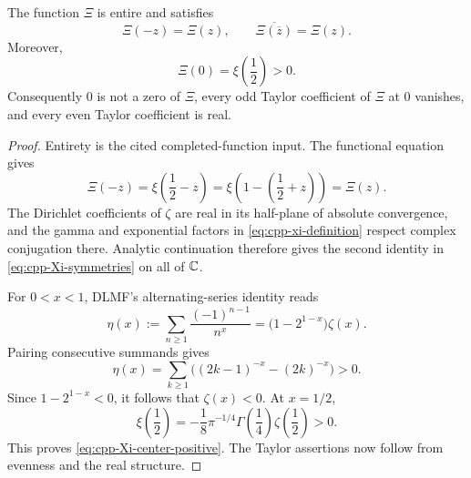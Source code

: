 \begin{proposition}
\label{prop:cpp-centered-symmetry}
The function \(\Xi\) is entire and satisfies
\begin{equation}
\label{eq:cpp-Xi-symmetries}
 \Xi(-z)=\Xi(z),
 \qquad
 \overline{\Xi(\overline z)}=\Xi(z).
\end{equation}
Moreover,
\begin{equation}
\label{eq:cpp-Xi-center-positive}
 \Xi(0)=\xi\!\left(\frac12\right)>0.
\end{equation}
Consequently \(0\) is not a zero of \(\Xi\), every odd Taylor coefficient of
\(\Xi\) at \(0\) vanishes, and every even Taylor coefficient is real.
\end{proposition}

\begin{proof}
Entirety is the cited completed-function input.  The functional equation gives
\[
 \Xi(-z)
 =
 \xi\!\left(\frac12-z\right)
 =
 \xi\!\left(1-\left(\frac12+z\right)\right)
 =
 \Xi(z).
\]
The Dirichlet coefficients of \(\zeta\) are real in its half-plane of absolute
convergence, and the gamma and exponential factors in
\eqref{eq:cpp-xi-definition} respect complex conjugation there.  Analytic
continuation therefore gives the second identity in
\eqref{eq:cpp-Xi-symmetries} on all of \(\mathbb C\).

For \(0<x<1\), DLMF's alternating-series identity
\cite[\S25.2, Eq.~25.2.3]{apostolDLMF25} reads
\[
 \eta(x)
 :=
 \sum_{n\geq1}\frac{(-1)^{n-1}}{n^x}
 =
 \bigl(1-2^{1-x}\bigr)\zeta(x).
\]
Pairing consecutive summands gives
\[
 \eta(x)
 =
 \sum_{k\geq1}\bigl((2k-1)^{-x}-(2k)^{-x}\bigr)>0.
\]
Since \(1-2^{1-x}<0\), it follows that \(\zeta(x)<0\).  At \(x=1/2\),
\[
 \xi\!\left(\frac12\right)
 =
 -\frac18\pi^{-1/4}\Gamma\!\left(\frac14\right)
 \zeta\!\left(\frac12\right)>0.
\]
This proves \eqref{eq:cpp-Xi-center-positive}.  The Taylor assertions now follow
from evenness and the real structure.
\end{proof}

